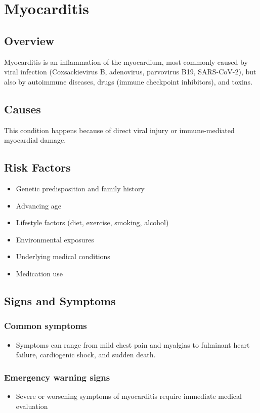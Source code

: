 \chapter{Myocarditis}
\label{sec:Myocarditis}

\section{Overview}
Myocarditis is an inflammation of the myocardium, most commonly caused by viral infection (Coxsackievirus B, adenovirus, parvovirus B19, SARS-CoV-2), but also by autoimmune diseases, drugs (immune checkpoint inhibitors), and toxins.
\section{Causes}
This condition happens because of direct viral injury or immune-mediated myocardial damage.     
\section{Risk Factors}

\begin{itemize}[noitemsep]
  \item Genetic predisposition and family history
  \item Advancing age
  \item Lifestyle factors (diet, exercise, smoking, alcohol)
  \item Environmental exposures
  \item Underlying medical conditions
  \item Medication use
\end{itemize}
\section{Signs and Symptoms}

\subsection{Common symptoms}
\begin{itemize}[noitemsep]
  \item Symptoms can range from mild chest pain and myalgias to fulminant heart failure, cardiogenic shock, and sudden death. 
  \end{itemize}

\subsection{Emergency warning signs}
\begin{itemize}[noitemsep]
  \item Severe or worsening symptoms of myocarditis require immediate medical evaluation
\end{itemize}
